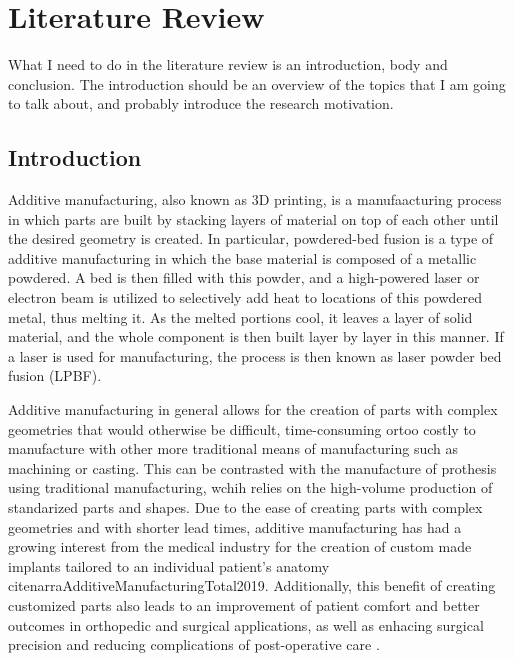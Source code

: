 \documentclass[../main.tex]{subfiles}
\begin{document}
	
\chapter{Literature Review}

What I need to do in the literature review is an introduction, body and conclusion. The introduction should be an overview of the topics that I am going to talk about, and probably introduce the research motivation.

\section{Introduction}

Additive manufacturing, also known as 3D printing, is a manufaacturing process in which parts are built by stacking layers of material on top of each other until the desired geometry is created. In particular, powdered-bed fusion is a type of additive manufacturing in which the base material is composed of a metallic powdered. A bed is then filled with this powder, and a high-powered laser or electron beam is utilized to selectively add heat to locations of this powdered metal, thus melting it. As the melted portions cool, it leaves a layer of solid material, and the whole component is then built layer by layer in this manner. If a laser is used for manufacturing, the process is then known as laser powder bed fusion (LPBF).

Additive manufacturing in general allows for the creation of parts with complex geometries that would otherwise be difficult, time-consuming ortoo costly to manufacture with other more traditional means of manufacturing such as machining or casting. This can be contrasted with the manufacture of prothesis using traditional manufacturing, wchih relies on the high-volume production of standarized parts and shapes. Due to the ease of creating parts with complex geometries and with shorter lead times, additive manufacturing has had a growing interest from the medical industry for the creation of custom made implants tailored to an individual patient's anatomy \cite{marshTrendsDevelopmentsHip2021} \\cite{narraAdditiveManufacturingTotal2019}. Additionally, this benefit of creating customized parts also leads to an improvement of patient comfort and better outcomes in orthopedic and surgical applications, as well as enhacing surgical precision and reducing complications of post-operative care \cite{mobarakRecentAdvancesAdditive2023} \cite{pathak3DPrintingBiomedicine2023}.
\end{document}
